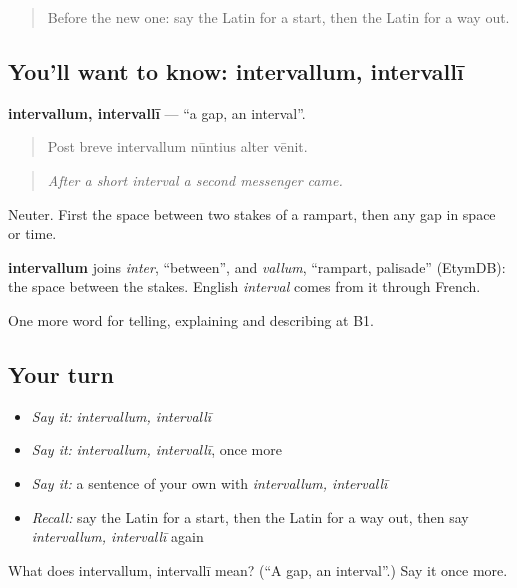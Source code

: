 \begin{quote}
Before the new one: say the Latin for a start, then the Latin for a way out.
\end{quote}

\subsection*{You'll want to know: intervallum, intervallī}
\textbf{intervallum, intervallī} — \textquotedblleft{}a gap, an interval\textquotedblright{}.

\begin{quote}
Post breve intervallum nūntius alter vēnit.
\end{quote}

\begin{quote}
\emph{After a short interval a second messenger came.}
\end{quote}

Neuter. First the space between two stakes of a rampart, then any gap in space or time.

\begin{cousinweb}
\textbf{intervallum} joins \emph{inter}, \textquotedblleft{}between\textquotedblright{}, and \emph{vallum}, \textquotedblleft{}rampart, palisade\textquotedblright{} (EtymDB): the space between the stakes. English \emph{interval} comes from it through French.
\end{cousinweb}

\begin{grammarlens}[title={What you've built}]
One more word for telling, explaining and describing at B1.
\end{grammarlens}

\subsection*{Your turn}
\begin{itemize}
\raggedright
  \item \emph{Say it:} \emph{intervallum, intervallī}
  \item \emph{Say it:} \emph{intervallum, intervallī}, once more
  \item \emph{Say it:} a sentence of your own with \emph{intervallum, intervallī}
  \item \emph{Recall:} say the Latin for a start, then the Latin for a way out, then say \emph{intervallum, intervallī} again
\end{itemize}

\begin{tcolorbox}[breakable,colback=teal!4,colframe=teal!35!black,title={Before you move on}]
What does intervallum, intervallī mean? (\textquotedblleft{}A gap, an interval\textquotedblright{}.) Say it once more.
\end{tcolorbox}
